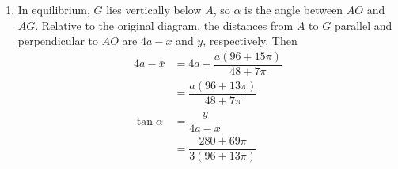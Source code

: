 \documentclass[leqno]{article}
\begin{document}
\begin{enumerate}[
  label=\textbf{\arabic*.},
  leftmargin=*,
  topsep=0pt,
  partopsep=0pt,
  parsep=0pt
]
\begin{djsSolution}
\begin{enumerate}[label=\textbf{(\alph*)}, start=1]
\begin{enumerate}[label=(\roman*), start=1]
The rectangle and semicircle each have their centre of mass at distance \(2a\) from \(OE\); the removed disc has its centre at distance \(a\). Taking moments about \(OE\):
\begin{align*}
\mathcal{A}\bar{x}&=12a^2(2a)+2\pi a^2(2a)-\dfrac{\pi a^2}{4}(a)\\
&=\dfrac{a^3(96+15\pi)}4\\
\bar{x}&=\dfrac{a(96+15\pi)}{48+7\pi}
\end{align*}

\item The centre of mass of a uniform semicircular lamina of radius \(r\) lies on its axis of symmetry, a distance \(\frac{4r}{3\pi}\) from its diameter. Here the diameter is \(3a\) above \(OA\), so the semicircle's centre of mass is at distance
\[
3a+\dfrac{4(2a)}{3\pi}=3a+\dfrac{8a}{3\pi}
\]

from \(OA\). The rectangle's centre is at distance \(\frac{3a}{2}\), and the removed disc's centre is at distance \(a\). Taking moments about \(OA\):
\begin{align*}
\mathcal{A}\bar{y}&=12a^2\left(\dfrac{3a}{2}\right)+2\pi a^2\left(3a+\dfrac{8a}{3\pi}\right)-\dfrac{\pi a^2}{4}(a)\\
&=a^3\left(18+6\pi+\dfrac{16}{3}-\dfrac{\pi}{4}\right)\\
&=\dfrac{a^3(280+69\pi)}{12}\\
\bar{y}&=\dfrac{a(280+69\pi)}{3(48+7\pi)}
\end{align*}

\end{enumerate}
\item In equilibrium, \(G\) lies vertically below \(A\), so \(\alpha\) is the angle between \(AO\) and \(AG\). Relative to the original diagram, the distances from \(A\) to \(G\) parallel and perpendicular to \(AO\) are \(4a-\bar{x}\) and \(\bar{y}\), respectively. Then
\begin{align*}
4a-\bar{x}&=4a-\dfrac{a(96+15\pi)}{48+7\pi}\\
&=\dfrac{a(96+13\pi)}{48+7\pi}\\
\tan\alpha&=\dfrac{\bar{y}}{4a-\bar{x}}\\
&=\dfrac{280+69\pi}{3(96+13\pi)}
\end{align*}

\end{enumerate}
\end{djsSolution}

\newpage

\questionitem


\end{enumerate}
\end{document}
